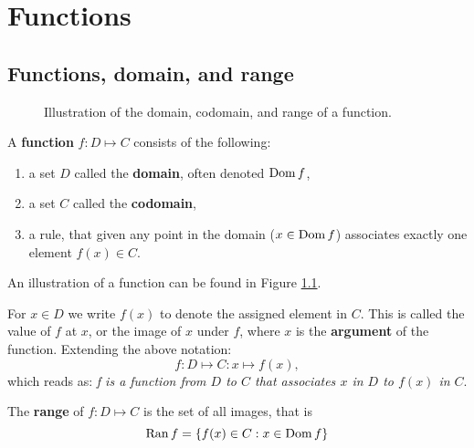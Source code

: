 \chapter{Functions}

\section{Functions, domain, and range}

\begin{figure}
    \centering
    \caption{Illustration of the domain, codomain, and range of a function.}
    \label{fig:function_definition}
\end{figure}

\begin{definition}
    A \textbf{function} $f:D\mapsto C$ consists of the following:
    \begin{enumerate}
        \item a set $D$ called the \textbf{domain}, often denoted $\operatorname{Dom} f$,
        \item a set $C$ called the \textbf{codomain},
        \item a rule, that given any point in the domain ($x\in\operatorname{Dom} f$) associates exactly one element $f(x)\in C$.
    \end{enumerate}
    An illustration of a function can be found in Figure \ref{fig:function_definition}.
\end{definition}

For $x\in D$ we write $f(x)$ to denote the assigned element in $C$. This is called the value of $f$ at $x$, or the image of $x$ under $f$, where $x$ is the \textbf{argument} of the function. Extending the above notation:
\[f:D\mapsto C:x\mapsto f(x),\]
which reads as: \emph{f is a function from $D$ to $C$ that associates $x$ in $D$ to $f(x)$ in $C$}.


\begin{definition}
    The \textbf{range} of $f:D\mapsto C$ is the set of all images, that is
    \[\operatorname{Ran} f=\{f(x)\in C:x\in\operatorname{Dom} f\}\]
\end{definition}

